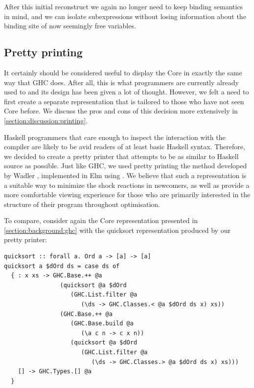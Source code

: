 After this initial reconstruct we again no longer need to keep binding semantics in mind, and we can isolate
subexpressions without losing information about the binding site of now seemingly free variables.

\subsection{Pretty printing}

It certainly should be considered useful to display the Core in exactly the same way that
GHC does. After all, this is what programmers are currently already used to and its design
has been given a lot of thought. However, we felt a need to first create a separate representation
that is tailored to those who have not seen Core before. We discuss the pros and cons of this decision
more extensively in \cref{section:discussion:printing}.

Haskell programmers that care enough to inspect the interaction with the compiler are likely to be
avid readers of at least basic Haskell syntax. Therefore, we decided to create a pretty printer that attempts
to be as similar to Haskell source as possible. Just like GHC, we used pretty printing the method developed 
by Wadler \cite{prettier_printer}, implemented in Elm using  \cite{prettier_printer_elm}.
We believe that such a representation is a suitable way to minimize the shock reactions in newcomers, as well as
provide a more comfortable viewing experience for those who are primarily interested in the structure of their program
throughout optimisation.

To compare, consider again the Core representation presented in \cref{section:background:ghc} with the quicksort
representation produced by our pretty printer:

\begin{listing}[H]
\begin{verbatim}
quicksort :: forall a. Ord a -> [a] -> [a]
quicksort a $dOrd ds = case ds of
  { : x xs -> GHC.Base.++ @a
                (quicksort @a $dOrd
                   (GHC.List.filter @a
                      (\ds -> GHC.Classes.< @a $dOrd ds x) xs))
                (GHC.Base.++ @a
                   (GHC.Base.build @a
                      (\a c n -> c x n))
                   (quicksort @a $dOrd
                      (GHC.List.filter @a
                         (\ds -> GHC.Classes.> @a $dOrd ds x) xs)))
    [] -> GHC.Types.[] @a
  }
\end{verbatim}
\end{listing}

